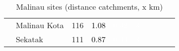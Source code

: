 \begin{table}[ht]
\begin{tabular}{C{0.05\textwidth}C{0.15\textwidth}C{0.08\textwidth}C{0.08\textwidth}C{0.08\textwidth}C{0.08\textwidth}C{0.08\textwidth}C{0.08\textwidth}C{0.08\textwidth}C{0.08\textwidth}}
   & Malinau Kota & 116 & \textcolor[HTML]{000000}{1.08} & \textcolor[HTML]{FFFFFF}{0.32} & \textcolor[HTML]{FFFFFF}{3} &  &  &  &  \\ 
   & Sekatak & 111 & \textcolor[HTML]{000000}{0.87} & \textcolor[HTML]{FFFFFF}{0.33} & \textcolor[HTML]{FFFFFF}{3} &  &  &  &  \\ 
  \end{tabular}
\endgroup
\caption{Malinau sites (distance catchments, x km)} 
\label{tab:malinau_dist}
\end{table}
